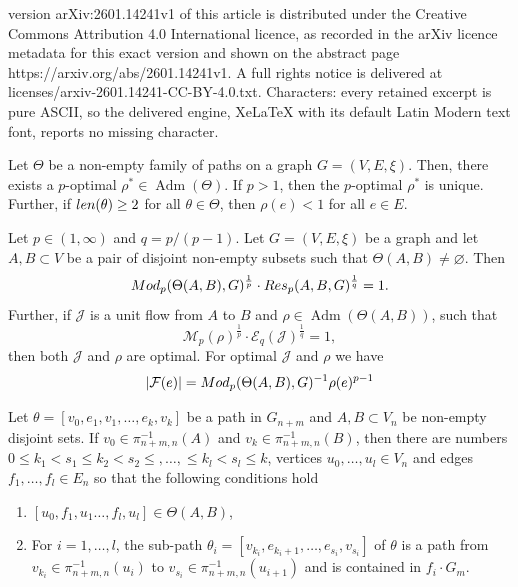\documentclass[10pt,a4paper]{amsart}
\newcommand{\Adm}{\operatorname{Adm}}
\newcommand{\Mod}{{\rm Mod}}
\newcommand{\Res}{{\rm Res}}
\newcommand{\cJ}{\mathcal{J}}
\newcommand{\len}{{\rm len}}
\begin{document}
version arXiv:2601.14241v1 of this article is distributed under the Creative Commons Attribution 4.0 International licence, as recorded in the arXiv licence metadata for this exact version and shown on the abstract page https://arxiv.org/abs/2601.14241v1. A full rights notice is delivered at licenses/arxiv-2601.14241-CC-BY-4.0.txt. Characters: every retained excerpt is pure ASCII, so the delivered engine, XeLaTeX with its default Latin Modern text font, reports no missing character.
\begin{lemma}\label{Lemma: Existence of Minimizers}
    Let \(\Theta\) be a non-empty family of paths on a graph \(G=(V,E,\xi)\). Then, there exists a $p$-optimal $\rho^*\in\Adm(\Theta)$. If \(p>1\), then the $p$-optimal $\rho^*$ is unique. Further,  if \(\len(\theta)\geq 2\) for all \(\theta\in\Theta\), then \(\rho(e)<1\) for all \(e\in E\).
\end{lemma}

\begin{proposition}\label{Proposition: Duality}
    Let $p\in (1,\infty)$ and $q = p/(p-1)$. Let \(G=(V,E,\xi)\) be a graph and let \(A,B\subset V\) be a pair of disjoint non-empty subsets such that $\Theta(A,B) \neq \varnothing$.
    Then
        \[
            \Mod_p(\Theta(A,B),G)^{\frac{1}{p}}\cdot\Res_p(A,B,G)^{\frac{1}{q}}=1.
        \]
    Further, if \(\cJ\) is a unit flow from \(A\) to \(B\) and \(\rho\in \Adm(\Theta(A,B))\), such that
        \[
            \mathcal{M}_p(\rho)^{\frac{1}{p}}\cdot\mathcal{E}_q(\mathcal{\cJ})^{\frac{1}{q}}=1,
        \]
    then both $\cJ$ and $\rho$ are optimal. For optimal $\cJ$ and $\rho$ we have
        \begin{equation}\label{flow_mod_vanish}
            \lvert \mathcal{F}(e) \rvert = \Mod_p(\Theta(A,B),G)^{-1}\rho(e)^{p-1}
        \end{equation}
\end{proposition}

\begin{proposition}\label{Proposition: Path lift}
    Let \(\theta=[v_0,e_1,v_1,\dots ,e_k,v_k]\) be a path in \(G_{n+m}\) and \(A,B\subset V_n\) be non-empty disjoint sets. If \(v_0\in \pi_{n+m,n}^{-1}(A)\) and \(v_k\in \pi_{n+m,n}^{-1}(B)\), then there are numbers \(0\leq k_1 < s_1 \leq k_2 < s_2\leq,\dots,\leq k_l < s_l\leq k\), vertices \(u_0,\dots ,u_l\in V_n\) and edges \(f_1,\dots ,f_l\in E_n\) so that the following conditions hold
    \begin{enumerate}
        \item \([u_0,f_1,u_1\dots,f_l,u_l]\in \Theta(A,B)\),
        \item For $i=1,\dots,l$, the sub-path \(\theta_i=[v_{k_i},e_{k_i+1},\dots ,e_{s_i}, v_{s_i}]\) of \(\theta\) is a path from  \(v_{k_i}\in\pi_{n+m,n}^{-1}(u_i)\) to \(v_{s_i}\in\pi_{n+m,n}^{-1}(u_{i+1})\) and is contained in \(f_i\cdot G_m\).
    \end{enumerate}
\end{proposition}
\end{document}
